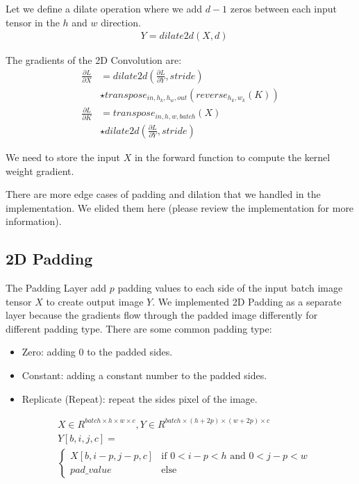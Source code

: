 \documentclass[conference]{IEEEtran}
\begin{document}
Let we define a dilate operation where we add \(d - 1\) zeros between each input tensor in the \(h\) and \(w\) direction.
\begin{equation}
\begin{split}
&Y = dilate2d(X, d) 
\end{split}
\end{equation}

The gradients of the 2D Convolution are:
\begin{equation}
\begin{split}
\frac{\partial L}{\partial X} &= dilate2d(\frac{\partial L}{\partial Y}, stride) \\
& \star transpose_{in,h_k,h_w,out}(reverse_{h_k,w_k}(K)) \\
\frac{\partial L}{\partial K} &= transpose_{in,h,w,batch}(X) \\
& \star dilate2d(\frac{\partial L}{\partial Y},stride)
\end{split}
\end{equation}

We need to store the input \(X\) in the forward function to compute the kernel weight gradient.

There are more edge cases of padding and dilation that we handled in the implementation. We elided them here (please review the implementation for more information).
\subsection{2D Padding}
The Padding Layer add \(p\) padding values to each side of the input batch image tensor \(X\) to create output image \(Y\).
We implemented 2D Padding as a separate layer because the gradients flow through the padded image differently for different padding type. There are some common padding type:
\begin{itemize}
    \item Zero: adding 0 to the padded sides.
    \item Constant: adding a constant number to the padded sides.
    \item Replicate (Repeat): repeat the sides pixel of the image. 
\end{itemize}

\begin{equation}
\begin{split}
&X \in R^{batch \times h \times w\times c}, Y \in R^{batch \times (h + 2p) \times (w + 2p) \times c} \\
&Y[b,i,j,c] = \\
&\begin{cases}
    X[b,i-p,j-p,c] & \text{if } 0 < i-p < h \text{ and }0 < j-p < w  \\
    pad\_value & \text{else}
\end{cases}
\end{split}
\end{equation}
\end{document}
